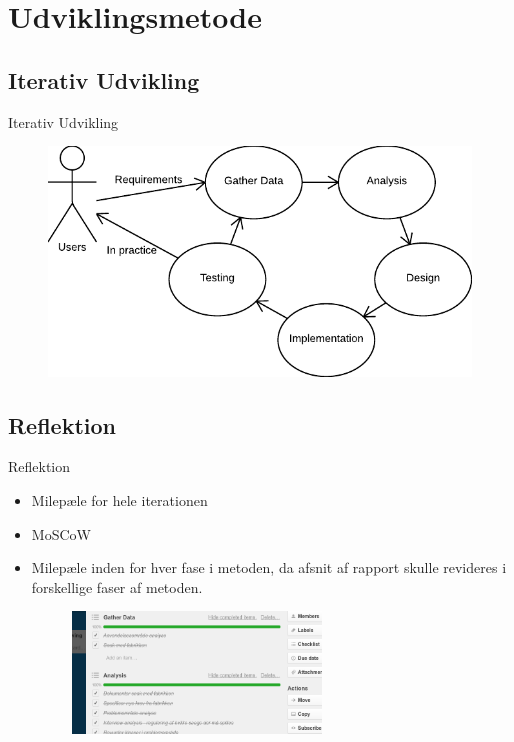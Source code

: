 \section{Udviklingsmetode}

\subsection{Iterativ Udvikling}
\begin{frame}{Iterativ Udvikling}
  \begin{figure}
    \centering
    \includegraphics[width=\textwidth]{slides/Heider/Developmentprocess}
  \end{figure}
\end{frame}
\subsection{Reflektion}
\begin{frame}{Reflektion}
  \begin{itemize}
    \item Milepæle for hele iterationen
    \item MoSCoW
    \item Milepæle inden for hver fase i metoden, da afsnit af rapport skulle revideres i forskellige faser af metoden.
    \begin{figure}
      \centering
      \includegraphics[width=250px]{slides/Heider/trello}
    \end{figure}
  \end{itemize}
\end{frame}
